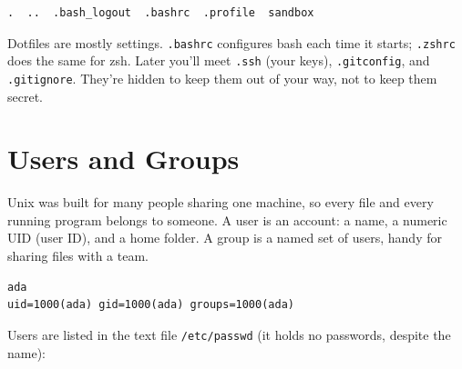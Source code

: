 \begin{codeblock}
\begin{Verbatim}[formatcom=\outputstyle]
.  ..  .bash_logout  .bashrc  .profile  sandbox
\end{Verbatim}
\end{codeblock}

Dotfiles are mostly settings. \texttt{.bashrc} configures bash each time it starts; \texttt{.zshrc} does the same for zsh. Later you'll meet \texttt{.ssh} (your keys), \texttt{.gitconfig}, and \texttt{.gitignore}. They're hidden to keep them out of your way, not to keep them secret.

\section{Users and Groups}\label{03-files-folders-and-who-may-touch-them:users-and-groups}

Unix was built for many people sharing one machine, so every file and every running program belongs to someone. A user is an account: a name, a numeric UID (user ID), and a home folder. A group is a named set of users, handy for sharing files with a team.

\begin{codeblock}

\begin{Shaded}
\begin{Highlighting}[]
\end{Highlighting}
\end{Shaded}

\end{codeblock}

\begin{codeblock}
\begin{Verbatim}[formatcom=\outputstyle]
ada
uid=1000(ada) gid=1000(ada) groups=1000(ada)
\end{Verbatim}
\end{codeblock}


Users are listed in the text file \texttt{/etc/passwd} (it holds no passwords, despite the name):

\begin{codeblock}

\begin{Shaded}
\begin{Highlighting}[]
\end{Highlighting}
\end{Shaded}

\end{codeblock}

